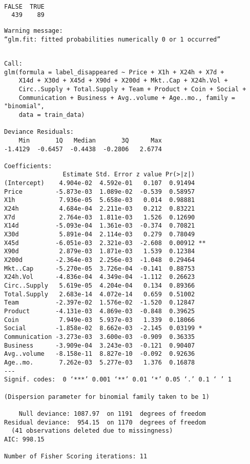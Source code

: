 \documentclass[11pt]{article}
\begin{document}
    \begin{verbatim}

FALSE  TRUE
  439    89
    \end{verbatim}


    \begin{Verbatim}[commandchars=\\\{\}]
Warning message:
“glm.fit: fitted probabilities numerically 0 or 1 occurred”
    \end{Verbatim}


    \begin{verbatim}

Call:
glm(formula = label_disappeared ~ Price + X1h + X24h + X7d +
    X14d + X30d + X45d + X90d + X200d + Mkt..Cap + X24h.Vol +
    Circ..Supply + Total.Supply + Team + Product + Coin + Social +
    Communication + Business + Avg..volume + Age..mo., family = "binomial",
    data = train_data)

Deviance Residuals:
    Min       1Q   Median       3Q      Max
-1.4129  -0.6457  -0.4438  -0.2806   2.6774

Coefficients:
                Estimate Std. Error z value Pr(>|z|)
(Intercept)    4.904e-02  4.592e-01   0.107  0.91494
Price         -5.873e-03  1.089e-02  -0.539  0.58957
X1h            7.936e-05  5.658e-03   0.014  0.98881
X24h           4.684e-04  2.211e-03   0.212  0.83221
X7d            2.764e-03  1.811e-03   1.526  0.12690
X14d          -5.093e-04  1.361e-03  -0.374  0.70821
X30d           5.891e-04  2.114e-03   0.279  0.78049
X45d          -6.051e-03  2.321e-03  -2.608  0.00912 **
X90d           2.879e-03  1.871e-03   1.539  0.12384
X200d         -2.364e-03  2.256e-03  -1.048  0.29464
Mkt..Cap      -5.270e-05  3.726e-04  -0.141  0.88753
X24h.Vol      -4.836e-04  4.349e-04  -1.112  0.26623
Circ..Supply   5.619e-05  4.204e-04   0.134  0.89366
Total.Supply   2.683e-14  4.072e-14   0.659  0.51002
Team          -2.397e-02  1.576e-02  -1.520  0.12847
Product       -4.131e-03  4.869e-03  -0.848  0.39625
Coin           7.949e-03  5.937e-03   1.339  0.18066
Social        -1.858e-02  8.662e-03  -2.145  0.03199 *
Communication -3.273e-03  3.600e-03  -0.909  0.36335
Business      -3.909e-04  3.243e-03  -0.121  0.90407
Avg..volume   -8.158e-11  8.827e-10  -0.092  0.92636
Age..mo.       7.262e-03  5.277e-03   1.376  0.16878
---
Signif. codes:  0 ‘***’ 0.001 ‘**’ 0.01 ‘*’ 0.05 ‘.’ 0.1 ‘ ’ 1

(Dispersion parameter for binomial family taken to be 1)

    Null deviance: 1087.97  on 1191  degrees of freedom
Residual deviance:  954.15  on 1170  degrees of freedom
  (41 observations deleted due to missingness)
AIC: 998.15

Number of Fisher Scoring iterations: 11

    \end{verbatim}
\end{document}
